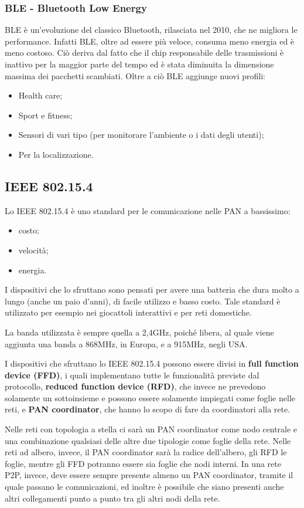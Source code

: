 \subsubsection{BLE - Bluetooth Low Energy}
BLE è un'evoluzione del classico Bluetooth, rilasciata nel 2010, che ne migliora
le performance. Infatti BLE, oltre ad essere più veloce, consuma meno energia ed
è meno costoso. Ciò deriva dal fatto che il chip responsabile delle trasmissioni
è inattivo per la maggior parte del tempo ed è stata diminuita la dimensione
massima dei pacchetti scambiati. Oltre a ciò BLE aggiunge nuovi profili:
\begin{itemize}
  \item Health care;
  \item Sport e fitness;
  \item Sensori di vari tipo (per monitorare l'ambiente o i dati degli utenti);
  \item Per la localizzazione.
\end{itemize}

\subsection{IEEE 802.15.4}
Lo IEEE 802.15.4 è uno standard per le comunicazione nelle PAN a bassissimo:
\begin{itemize}
  \item costo;
  \item velocità;
  \item energia.
\end{itemize}

I dispositivi che lo sfruttano sono pensati per avere una batteria che dura
molto a lungo (anche un paio d'anni), di facile utilizzo e basso costo. Tale
standard è utilizzato per esempio nei giocattoli interattivi e per reti
domestiche.

La banda utilizzata è sempre quella a 2,4GHz, poiché libera, al quale viene
aggiunta una banda a 868MHz, in Europa, e a 915MHz, negli USA.

I dispositivi che sfruttano lo IEEE 802.15.4 possono essere divisi in
\textbf{full function device (FFD)}, i quali implementano tutte le funzionalità
previste dal protocollo, \textbf{reduced function device (RFD)}, che invece ne
prevedono solamente un sottoinsieme e possono essere solamente impiegati come
foglie nelle reti, e \textbf{PAN coordinator}, che hanno lo scopo di fare da
coordinatori alla rete.

Nelle reti con topologia a stella ci sarà un PAN coordinator come nodo centrale
e una combinazione qualsiasi delle altre due tipologie come foglie della rete.
Nelle reti ad albero, invece, il PAN coordinator sarà la radice dell'albero, gli
RFD le foglie, mentre gli FFD potranno essere sia foglie che nodi interni. In
una rete P2P, invece, deve essere sempre presente almeno un PAN coordinator,
tramite il quale passano le comunicazioni, ed inoltre è possibile che siano
presenti anche altri collegamenti punto a punto tra gli altri nodi della rete.

